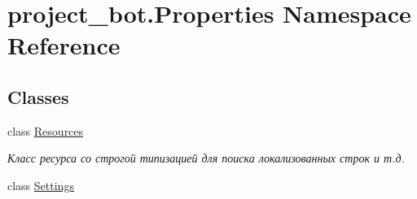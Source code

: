 \hypertarget{namespaceproject__bot_1_1_properties}{}\section{project\+\_\+bot.\+Properties Namespace Reference}
\label{namespaceproject__bot_1_1_properties}
\subsection*{Classes}
\begin{DoxyCompactItemize}
\item 
class \hyperlink{classproject__bot_1_1_properties_1_1_resources}{Resources}
\begin{DoxyCompactList}\small\item\em Класс ресурса со строгой типизацией для поиска локализованных строк и т.\+д. \end{DoxyCompactList}\item 
class \hyperlink{classproject__bot_1_1_properties_1_1_settings}{Settings}
\end{DoxyCompactItemize}
